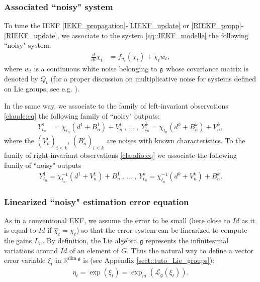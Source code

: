 \documentclass[a4paper,12pt,onecolumn]{article}
\newcommand{\Rg}{{\mathbb R^{\text{dim } \mathfrak g}}}
\begin{document}
\subsubsection{Associated ``noisy" system}
To tune the IEKF \eqref{IEKF_propagation}-\eqref{LIEKF_update} or  \eqref{RIEKF_propp}-\eqref{RIEKF_update}, we associate to the system \eqref{eq::IEKF_modelle} the following
``noisy" system:
\begin{align}
\frac{d}{dt}\chi_t & = f_{u_t}(\chi_t)+\chi_t w_t, \label{eq::IEKF_model}
\end{align}
 where
 $w_t$ is a continuous white noise belonging to $\frak{g}$ whose covariance matrix is denoted by $Q_t$ (for a proper discussion on multiplicative noise for systems defined on Lie groups, see e.g. \cite{barrau2013intrinsic}). 



In the same way, we associate to the family of left-invariant observations \eqref{claude:eq} the following family of ``noisy" outputs:
\begin{align}\label{claude:noise}
Y^1_{t_n} & = \chi_{t_n} \left( d^1+B_n^1 \right) + V_n^1 ~ , ~
  ... ~ , ~
Y^k_{t_n} = \chi_{t_n} \left( d^k+B_n^k \right) +V_n^k,
\end{align}
where the $(V_n^i)_{i \leq k}$, $(B_n^i)_{i \leq k}$ are noises with known characteristics.  To the family of right-invariant observations \eqref{claudio:eq} we associate the following family of ``noisy" outputs
\begin{align}\label{claudio:noise}
Y^1_{t_n} = \chi_{t_n}^{-1 } \left( d^1+V_n^1 \right) + B_n^1 ~ , ~
  ... ~ , ~
Y^k_{t_n} = \chi_{t_n}^{-1} \left( d^k+V_n^k \right) + B_n^k. \end{align}





\subsubsection{Linearized ``noisy" estimation error equation}
As in a conventional EKF, we assume the error to be small (here close to $Id$ as it is equal to $Id$ if $\hat \chi_t=\chi_t$) so that the error system can be linearized to compute the gains $L_n$. By definition, the Lie algebra $\mathfrak{g}$ represents the infinitesimal variations around $Id$ of an element of $G$. Thus the natural way to define a vector error variable $\xi_t$ in $\Rg$ is (see Appendix \ref{sect::tuto_Lie_groups}):
\begin{align}
\eta_t\label{expmap}=\exp(\xi_t)=\exp_m \left( \mathcal{L}_{\mathfrak{g}}({\xi}_t) \right).
\end{align}
\end{document}
